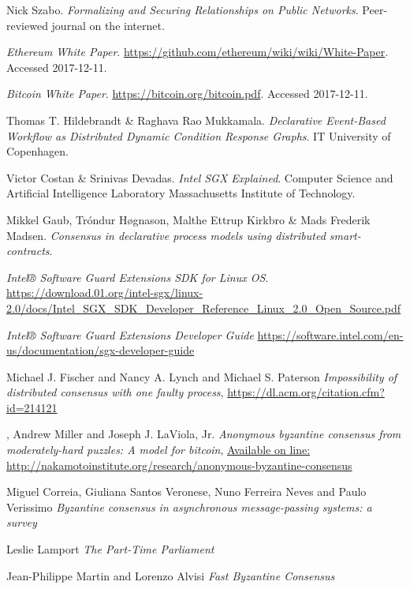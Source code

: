 \documentclass[12pt]{article}
\begin{document}
	\begin{thebibliography}{9}

		Nick Szabo.
		\textit{Formalizing and Securing Relationships on Public Networks}.
		Peer-reviewed journal on the internet.

		\textit{Ethereum White Paper}.
		\url{https://github.com/ethereum/wiki/wiki/White-Paper}.
		Accessed 2017-12-11.

		\textit{Bitcoin White Paper}.
		\url{https://bitcoin.org/bitcoin.pdf}.
		Accessed 2017-12-11.

		Thomas T. Hildebrandt \& Raghava Rao Mukkamala.
		\textit{Declarative Event-Based Workflow as Distributed Dynamic Condition Response Graphs}.
		IT University of Copenhagen.

		Victor Costan \& Srinivas Devadas.
		\textit{Intel SGX Explained}.
		Computer Science and Artificial Intelligence Laboratory Massachusetts Institute of Technology.

		Mikkel Gaub, Tróndur Høgnason, Malthe Ettrup Kirkbro \& Mads Frederik Madsen.
		\textit{Consensus in declarative process models using distributed smart-contracts}.

		\textit{Intel® Software Guard Extensions SDK for Linux OS}.
		\url{https://download.01.org/intel-sgx/linux-2.0/docs/Intel_SGX_SDK_Developer_Reference_Linux_2.0_Open_Source.pdf}

		\textit{Intel® Software Guard Extensions Developer Guide}
		\url{https://software.intel.com/en-us/documentation/sgx-developer-guide}

		Michael J. Fischer and  Nancy A. Lynch and Michael S. Paterson
		\textit{Impossibility of distributed consensus with one faulty process},
		\url{https://dl.acm.org/citation.cfm?id=214121}

		,
		Andrew Miller and Joseph J. LaViola, Jr.
  		\textit{Anonymous byzantine consensus from moderately-hard puzzles: A model for bitcoin},
		\url{Available on line: http://nakamotoinstitute.org/research/anonymous-byzantine-consensus}

		Miguel Correia, Giuliana Santos Veronese, Nuno Ferreira Neves and Paulo Verissimo
		\textit{Byzantine consensus in asynchronous message-passing systems: a survey} 

		Leslie Lamport
		\textit{The Part-Time Parliament} 

		Jean-Philippe Martin and Lorenzo Alvisi
		\textit{Fast Byzantine Consensus}



	\end{thebibliography}
\end{document}
